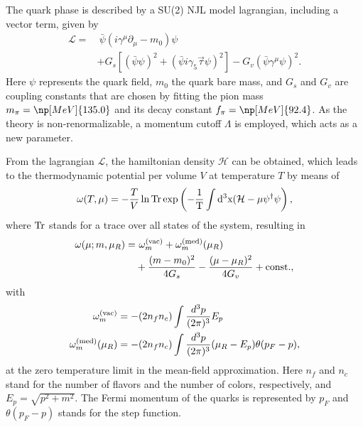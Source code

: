 \documentclass[prc, reprint, amsmath, floatfix, linenumbers,10pt]{revtex4-1}
\newcommand{\tr}{\rm{Tr}}
\begin{document}
The quark phase is described by a SU(2) NJL model lagrangian, including a vector term, given by \cite{Buballa2005}
\begin{equation}\label{Eq:LagNJL-SU2-Bub}
\begin{split}
	\mathcal{L} =&~ \bar{\psi}(i\gamma^\mu\partial_\mu - m_0)\psi \\
	&+ G_s[(\bar{\psi}\psi)^2 + (\bar{\psi}i\gamma_5\vec{\tau}\psi)^2] - G_v(\bar{\psi}\gamma^\mu \psi)^2.
\end{split}
\end{equation}
%
Here $\psi$ represents the quark field, $m_0$ the quark bare mass, and $G_s$ and $G_v$ are coupling constants that are chosen by fitting the pion mass $m_\pi = \np[MeV]{135.0}$ and its decay constant $f_\pi = \np[MeV]{92.4}$. As the theory is non-renormalizable, a momentum cutoff $\Lambda$ is employed, which acts as a new parameter.

From the lagrangian $\mathcal{L}$, the hamiltonian density $\mathcal{H}$ can be obtained, which leads to the thermodynamic potential per volume $V$ at temperature $T$ by means of
\begin{equation}
	\omega(T, \mu) = -\frac{T}{V} \ln \tr \exp\left(-\frac{1}{T}\int d^3x(\mathcal{H} - \mu\psi^\dagger\psi\right),
\end{equation}
%
where $\tr$ stands for a trace over all states of the system, resulting in \cite{Buballa1996}
\begin{equation}\label{Eq:Pot_Termo_Temp_zero}
\begin{split}
	\omega(\mu; m, \mu_R) =&~ \omega_m^{(\rm{vac})} + \omega_m^{(\rm{med})}(\mu_R) \\
	&+ \frac{(m - m_0)^2}{4G_s} - \frac{(\mu - \mu_R)^2}{4G_v} +  \textrm{const.},
\end{split}
\end{equation}
%
with
\begin{align}
	\omega_m^{(\rm{vac})} &= -(2 n_f n_c) \int \frac{d^3p}{(2\pi)^3} E_p\\
	\omega_m^{(\rm{med})}(\mu_R) &= - (2n_f n_c) \int\frac{d^3p}{(2 \pi)^3} (\mu_R - E_p) \theta(p_F -p),
\end{align}
%
at the zero temperature limit in the mean-field approximation. Here $n_f$ and $n_c$ stand for the number of flavors and the number of colors, respectively, and $E_p = \sqrt{p^2 + m^2}$. The Fermi momentum of the quarks is represented by $p_F$ and $\theta(p_F - p)$ stands for the step function.
\end{document}

